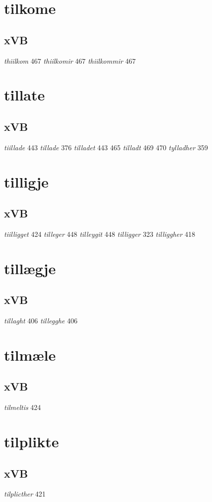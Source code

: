 \documentclass[a4paper,twocolumn]{article}
\begin{document}
\section{tilkome}
\label{sec:orgdc7d013}
\subsection{xVB}
\label{sec:orgd703fcf}
\emph{thiilkom} 467 \emph{thiilkomir} 467 \emph{thiilkommir} 467 
\section{tillate}
\label{sec:orgb917bfc}
\subsection{xVB}
\label{sec:org8b2573d}
\emph{tiillade} 443 \emph{tillade} 376 \emph{tilladet} 443 465 \emph{tilladt} 469 470 \emph{tylladher} 359 
\section{tilligje}
\label{sec:org5c393dc}
\subsection{xVB}
\label{sec:orgc8a7831}
\emph{tiilligget} 424 \emph{tilleger} 448 \emph{tilleygit} 448 \emph{tilligger} 323 \emph{tilliggher} 418 
\section{tillægje}
\label{sec:org8316752}
\subsection{xVB}
\label{sec:org9a77486}
\emph{tillaght} 406 \emph{tillegghe} 406 
\section{tilmæle}
\label{sec:orgdcf9fd0}
\subsection{xVB}
\label{sec:org8bcf623}
\emph{tilmeltis} 424 
\section{tilplikte}
\label{sec:org69bfeb5}
\subsection{xVB}
\label{sec:org8df46f8}
\emph{tilplicther} 421 
\end{document}
